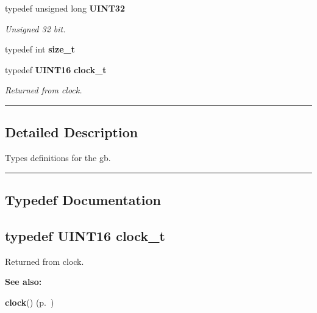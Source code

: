 \begin{CompactItemize}
\item 
\label{asm/gbz80/types.h_a7}
typedef unsigned long {\bf UINT32}
\begin{CompactList}\small\item\em Unsigned 32 bit.\item\end{CompactList}

\item 
\label{asm/gbz80/types.h_a8}
typedef int {\bf size\_\-t}
\item 
typedef {\bf UINT16} {\bf clock\_\-t}
\begin{CompactList}\small\item\em Returned from clock.\item\end{CompactList}

\end{CompactItemize}
\vspace{0.4cm}\hrule\vspace{0.2cm}
\subsection*{Detailed Description}
Types definitions for the gb.\vspace{0.4cm}\hrule\vspace{0.2cm}
\subsection*{Typedef Documentation}
\label{asm/gbz80/types.h_a9}
\subsection{\setlength{\rightskip}{0pt plus 5cm}typedef {\bf UINT16} clock\_\-t}

Returned from clock.

\begin{Desc}
\item[{\bf See also: }]\par
{\bf clock}() {\rm (p.~\pageref{time.h_a1})} \end{Desc}
